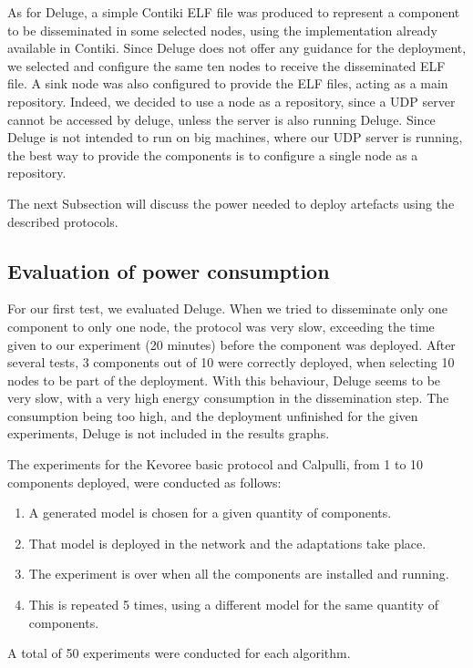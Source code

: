 As for Deluge,  a simple Contiki ELF file was produced to represent a component to be disseminated in some selected nodes, using the implementation already available in Contiki.
Since Deluge does not offer any guidance for the deployment, we selected and configure the same ten nodes to receive the disseminated ELF file.
A sink node was also configured to provide the ELF files, acting as a main repository.
Indeed, we decided to use a node as a repository, since a UDP server cannot be accessed by deluge, unless the server is also running Deluge.
Since Deluge is not intended to run on big machines, where our UDP server is running, the best way to provide the components is to configure a single node as a repository.

The next Subsection will discuss the power needed to deploy artefacts using the described protocols. 

\subsection{Evaluation of power consumption}
For our first test, we evaluated Deluge.
When we tried to disseminate only one component to only one node, the protocol was very slow, exceeding the time given to our experiment (20 minutes) before the component was deployed. After several tests, 3 components out of 10 were correctly deployed, when selecting 10 nodes to be part of the deployment.
With this behaviour, Deluge seems to be very slow, with a very high energy consumption in the dissemination step. The consumption being too high, and the deployment unfinished for the given experiments, Deluge is not included in the results graphs.

The experiments for the Kevoree basic protocol and Calpulli, from 1 to 10 components deployed, were conducted as follows:
\begin{enumerate}
	\item A generated model is chosen for a given quantity of components.
	\item That model is deployed in the network and the adaptations take place.
	\item The experiment is over when all the components are installed and running.
	\item This is repeated 5 times, using a different model for the same quantity of components.
\end{enumerate}

A total of 50 experiments were conducted for each algorithm.

